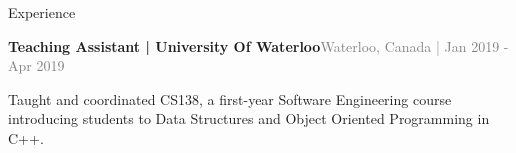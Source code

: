 \documentclass[hidelinks]{resume} %
\begin{document}
\begin{rSection}{Experience}
\begin{rSubsection}{\textbf{Teaching Assistant | University Of Waterloo}}{\textcolor{gray}{\small Waterloo, Canada | Jan 2019 - Apr 2019}}{}
    \begin{bulletpoints}
        \vspace{-.10cm}
        \item Taught and coordinated CS138, a first-year Software Engineering course introducing students to Data Structures and Object Oriented Programming in C++.
        \vspace{-.10cm}
    \end{bulletpoints}   

\end{rSubsection}

\end{rSection}

\vspace{-.1cm}
\end{document}
